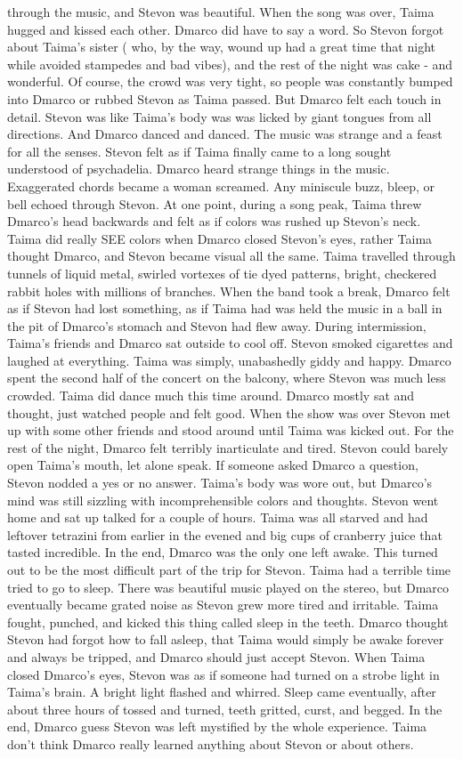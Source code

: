 \documentclass[12pt]{book}
\begin{document}
through the music, and Stevon was beautiful. When the song was over, Taima hugged and kissed each other. Dmarco did have to say a word. So Stevon forgot about Taima's sister ( who, by the way, wound up had a great time that night while avoided stampedes and bad vibes), and the rest of the night was cake - and wonderful. Of course, the crowd was very tight, so people was constantly bumped into Dmarco or rubbed Stevon as Taima passed. But Dmarco felt each touch in detail. Stevon was like Taima's body was was licked by giant tongues from all directions. And Dmarco danced and danced. The music was strange and a feast for all the senses. Stevon felt as if Taima finally came to a long sought understood of psychadelia. Dmarco heard strange things in the music. Exaggerated chords became a woman screamed. Any miniscule buzz, bleep, or bell echoed through Stevon. At one point, during a song peak, Taima threw Dmarco's head backwards and felt as if colors was rushed up Stevon's neck. Taima did really SEE colors when Dmarco closed Stevon's eyes, rather Taima thought Dmarco, and Stevon became visual all the same. Taima travelled through tunnels of liquid metal, swirled vortexes of tie dyed patterns, bright, checkered rabbit holes with millions of branches. When the band took a break, Dmarco felt as if Stevon had lost something, as if Taima had was held the music in a ball in the pit of Dmarco's stomach and Stevon had flew away. During intermission, Taima's friends and Dmarco sat outside to cool off. Stevon smoked cigarettes and laughed at everything. Taima was simply, unabashedly giddy and happy. Dmarco spent the second half of the concert on the balcony, where Stevon was much less crowded. Taima did dance much this time around. Dmarco mostly sat and thought, just watched people and felt good. When the show was over Stevon met up with some other friends and stood around until Taima was kicked out. For the rest of the night, Dmarco felt terribly inarticulate and tired. Stevon could barely open Taima's mouth, let alone speak. If someone asked Dmarco a question, Stevon nodded a yes or no answer. Taima's body was wore out, but Dmarco's mind was still sizzling with incomprehensible colors and thoughts. Stevon went home and sat up talked for a couple of hours. Taima was all starved and had leftover tetrazini from earlier in the evened and big cups of cranberry juice that tasted incredible. In the end, Dmarco was the only one left awake. This turned out to be the most difficult part of the trip for Stevon. Taima had a terrible time tried to go to sleep. There was beautiful music played on the stereo, but Dmarco eventually became grated noise as Stevon grew more tired and irritable. Taima fought, punched, and kicked this thing called sleep in the teeth. Dmarco thought Stevon had forgot how to fall asleep, that Taima would simply be awake forever and always be tripped, and Dmarco should just accept Stevon. When Taima closed Dmarco's eyes, Stevon was as if someone had turned on a strobe light in Taima's brain. A bright light flashed and whirred. Sleep came eventually, after about three hours of tossed and turned, teeth gritted, curst, and begged. In the end, Dmarco guess Stevon was left mystified by the whole experience. Taima don't think Dmarco really learned anything about Stevon or about others. 
\end{document}
